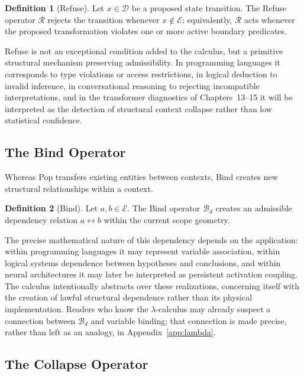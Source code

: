 \documentclass[11pt,twoside,openright]{book}
\numberwithin{equation}{chapter}
\theoremstyle{definition}
\newtheorem{definition}{Definition}[chapter]
\theoremstyle{plain}
\theoremstyle{remark}
\theoremstyle{definition}
\newcommand{\Refuse}{\mathcal{R}}
\newcommand{\Bind}{\mathcal{B}_d}
\newcommand{\Interior}{\mathcal{E}}
\newcommand{\Domain}{\mathcal{D}}
\begin{document}
\begin{definition}[Refuse]
Let $x\in\Domain$ be a proposed state transition. The Refuse operator
$\Refuse$ rejects the transition whenever $x\notin\Interior$; equivalently,
$\Refuse$ acts whenever the proposed transformation violates one or more
active boundary predicates.
\end{definition}

Refuse is not an exceptional condition added to the calculus, but a
primitive structural mechanism preserving admissibility. In programming
languages it corresponds to type violations or access restrictions, in
logical deduction to invalid inference, in conversational reasoning to
rejecting incompatible interpretations, and in the transformer
diagnostics of Chapters~13--15 it will be interpreted as the detection of
structural context collapse rather than low statistical confidence.

\subsection{The Bind Operator}

Whereas Pop transfers existing entities between contexts, Bind creates new
structural relationships within a context.

\begin{definition}[Bind]
Let $a,b\in\Interior$. The Bind operator $\Bind$ creates an admissible
dependency relation $a\leftrightarrow b$ within the current scope
geometry.
\end{definition}

The precise mathematical nature of this dependency depends on the
application: within programming languages it may represent variable
association, within logical systems dependence between hypotheses and
conclusions, and within neural architectures it may later be interpreted
as persistent activation coupling. The calculus intentionally abstracts
over these realizations, concerning itself with the creation of lawful
structural dependence rather than its physical implementation. Readers
who know the $\lambda$-calculus may already suspect a connection between
$\Bind$ and variable binding; that connection is made precise, rather
than left as an analogy, in Appendix~\ref{app:lambda}.

\subsection{The Collapse Operator}
\end{document}

